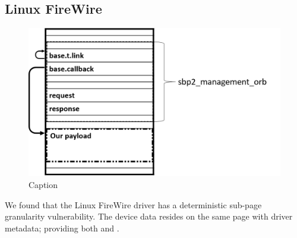 \subsection{Linux FireWire} \label{sec:sbp2_attack}
\begin{figure}
    \centering
    \includegraphics[width=1.1\linewidth]{figs/sbp.png}
    \caption{Caption}
    \label{fig:orb}
\end{figure}
We found that the Linux FireWire driver has a deterministic sub-page granularity vulnerability. The device data resides on the same page with driver metadata; providing both \means and \oportunity .\newline
